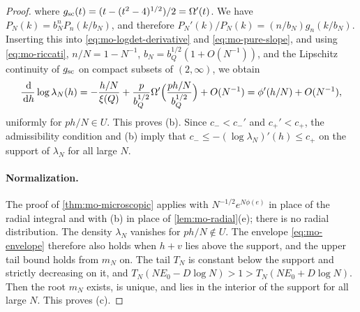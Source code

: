\begin{proof}
where $g_{\rm sc}(t)=(t-(t^2-4)^{1/2})/2=\Omega'(t)$.
We have $P_N(k)=b_N^nP_n(k/b_N)$, and therefore $P_N'(k)/P_N(k)=(n/b_N)g_n(k/b_N)$. Inserting this into \eqref{eq:mo-logdet-derivative} and \eqref{eq:mo-pure-slope}, and using \eqref{eq:mo-riccati}, $n/N=1-N^{-1}$, $b_N=b_Q^{1/2}(1+O(N^{-1}))$, and the Lipschitz continuity of $g_{\rm sc}$ on compact subsets of $(2,\infty)$, we obtain
\[
\frac{\,\mathrm d}{\,\mathrm d h}\log\lambda_N(h)=-\frac{h/N}{\xi(Q)}+\frac p{b_Q^{1/2}}\Omega'\Bigl(\frac{ph/N}{b_Q^{1/2}}\Bigr)+O(N^{-1})=\phi'(h/N)+O(N^{-1}),
\]
uniformly for $ph/N\in U$. This proves (b). Since $c_-<c_-'$ and $c_+'<c_+$, the admissibility condition and (b) imply that $c_-\le-(\log\lambda_N)'(h)\le c_+$ on the support of $\lambda_N$ for all large $N$.

\paragraph{Normalization.}
The proof of \cref{thm:mo-microscopic} applies with $N^{-1/2}e^{N\phi(e)}$ in place of the radial integral and with (b) in place of \cref{lem:mo-radial}(e); there is no radial distribution. The density $\lambda_N$ vanishes for $ph/N\notin U$. The envelope \eqref{eq:mo-envelope} therefore also holds when $h+v$ lies above the support, and the upper tail bound holds from $m_N$ on. The tail $T_N$ is constant below the support and strictly decreasing on it, and $T_N(NE_0-D\log N)>1>T_N(NE_0+D\log N)$. Then the root $m_N$ exists, is unique, and lies in the interior of the support for all large $N$. This proves (c).


\end{proof}
